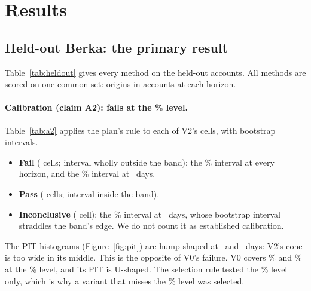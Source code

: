 \section{Results}
\label{sec:results}

\subsection{Held-out Berka: the primary result}
Table~\ref{tab:heldout} gives every method on the held-out accounts. All
methods are scored on one common set:  origins
in  accounts at each horizon.

\begin{table}[t]
\centering\footnotesize\setlength{\tabcolsep}{4pt}
\caption{Held-out Berka, every method on the same
 origins in  accounts
per horizon (days). Columns:
(1) pooled coverage of central intervals (\%);
(2) CRPS skill against B-SA+ as the mean of per-account ratios (positive:
lower CRPS than B-SA+);
(3) the share of PIT values in the outer two of ten bins (\%; a flat
histogram puts a fifth there).
B-SA is a point forecast, so its coverage is undefined (--). Pooled skills,
mean CRPS and intervals for V2's comparisons are in
Table~\ref{tab:pairwise}.}
\label{tab:heldout}
\end{table}

\paragraph{Calibration (claim A2): fails at the \lA\% level.}
Table~\ref{tab:a2} applies the plan's rule to each of V2's cells, with
bootstrap intervals.
\begin{itemize}
\item \textbf{Fail} ( cells; interval wholly outside the
  band): the \lA\% interval at every horizon, and the \lB\% interval at
  \hB\ days.
\item \textbf{Pass} ( cells; interval inside the band).
\item \textbf{Inconclusive} ( cell): the \lD\%
  interval at \hA\ days, whose bootstrap interval straddles the band's
  edge. We do not count it as established calibration.
\end{itemize}
The PIT histograms (Figure~\ref{fig:pit}) are hump-shaped at \hB\ and \hC\
days: V2's cone is too wide in its middle. This is the opposite of V0's
failure. V0 covers \R{ho/var/V0/30/cov90}\% and \R{ho/var/V0/90/cov90}\% at
the \lC\% level, and its PIT is U-shaped. The selection rule tested the
\lC\% level only, which is why a variant that misses the \lA\% level was
selected.

